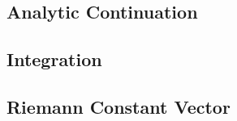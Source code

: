 \subsection{Analytic
  Continuation}\label{subsec:abelfunctions-analytic-continuation}


\subsection{Integration}\label{subsec:abelfunctions-integration}


\subsection{Riemann Constant
  Vector}\label{subsec:abelfunctions-riemann-constant-vector}
